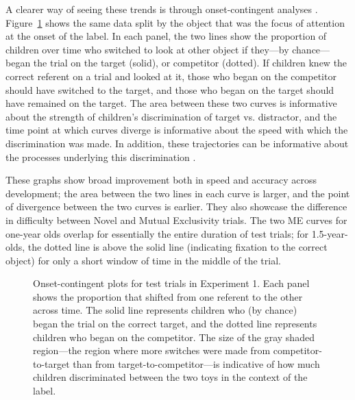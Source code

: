 \documentclass[man,floatsintext]{apa6}
\begin{document}
A clearer way of seeing these trends is through onset-contingent analyses \cite{fernald2008}. Figure~\ref{fig:exp1_split} shows the same data split by the object that was the focus of attention at the onset of the label. In each panel, the two lines show the proportion of children over time who switched to look at other object if they---by chance---began the trial on the target (solid), or competitor (dotted). If children knew the correct referent on a trial and looked at it, those who began on the competitor should have switched to the target, and those who began on the target should have remained on the target. The area between these two curves is informative about the strength of children's discrimination of target vs. distractor, and the time point at which curves diverge is informative about the speed with which the discrimination was made. In addition, these trajectories can be informative about the processes underlying this discrimination \cite{Halberda2006}. 

These graphs show broad improvement both in speed and accuracy across development; the area between the two lines in each curve is larger, and the point of divergence between the two curves is earlier. They also showcase the difference in difficulty between Novel and Mutual Exclusivity trials. The two ME curves for one-year olds overlap for essentially the entire duration of test trials; for 1.5-year-olds, the dotted line is above the solid line (indicating fixation to the correct object) for only a short window of time in the middle of the trial. 

\begin{figure}[tb]
	\caption{\label{fig:exp1_split} Onset-contingent plots for test trials in Experiment 1. Each panel shows the proportion that shifted from one referent to the other across time. The solid line represents children who (by chance) began the trial on the correct target, and the dotted line represents children who began on the competitor. The size of the gray shaded region---the region where more switches were made from competitor-to-target than from target-to-competitor---is indicative of how much children discriminated between the two toys in the context of the label.}
\end{figure}
\end{document}
